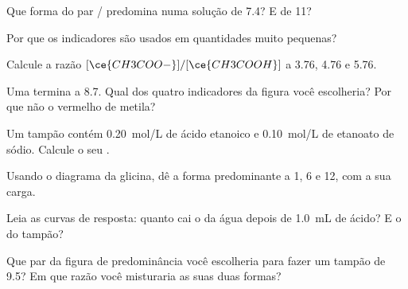 \begin{exercise}[$\star$]\label{exo:g12:buffers-predominance:4}
Que forma do par / predomina numa solução de  7.4? E
de  11?
\end{exercise}

\begin{exercise}[$\star$]\label{exo:g12:buffers-predominance:5}
Por que os indicadores são usados em quantidades muito pequenas?
\end{exercise}

\begin{exercise}[$\star\star$]\label{exo:g12:buffers-predominance:6}
Calcule a razão $[\ce{CH3COO-}]/[\ce{CH3COOH}]$ a  3.76, 4.76 e
5.76.
\end{exercise}

\begin{exercise}[$\star\star$]\label{exo:g12:buffers-predominance:7}
Uma  termina a  8.7. Qual dos quatro indicadores da figura
você escolheria? Por que não o vermelho de metila?
\end{exercise}

\begin{exercise}[$\star\star$]\label{exo:g12:buffers-predominance:8}
Um tampão contém \qty{0.20}{mol/L} de ácido etanoico e
\qty{0.10}{mol/L} de etanoato de sódio. Calcule o seu .
\end{exercise}

\begin{exercise}[$\star\star$]\label{exo:g12:buffers-predominance:9}
Usando o diagrama da glicina, dê a forma predominante a  1, 6 e 12,
com a sua carga.
\end{exercise}

\begin{exercise}[$\star\star$]\label{exo:g12:buffers-predominance:10}
Leia as curvas de resposta: quanto cai o  da água depois de
\qty{1.0}{mL} de ácido? E o do tampão?
\end{exercise}

\begin{exercise}[$\star\star$]\label{exo:g12:buffers-predominance:11}
Que par da figura de predominância você escolheria para fazer um tampão
de  9.5? Em que razão você misturaria as suas duas formas?
\end{exercise}

